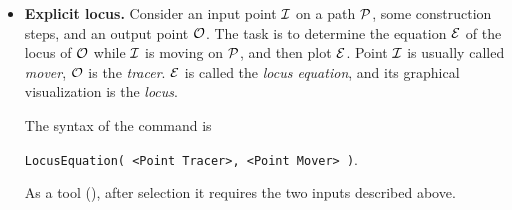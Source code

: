\documentclass{article}
\begin{document}
\begin{itemize}
\item\textbf{Explicit locus.}
Consider an input point $\cal{I}$ on a path $\cal{P}$, some construction steps, and an output point $\cal O$. The task is to determine the equation $\cal E$ of the locus of $\cal O$ while $\cal I$ is moving on $\cal P$, and then plot $\cal E$. Point $\cal I$ is usually called \textit{mover}, $\cal O$ is the \textit{tracer}. $\cal E$ is called the \textit{locus equation}, and its graphical visualization is the \textit{locus}.

The syntax of the command is
\begin{center}
    \texttt{LocusEquation( <Point Tracer>, <Point Mover> )}.
\end{center}

As a tool (), after selection it requires the two inputs described above.


\end{itemize}
\end{document}
